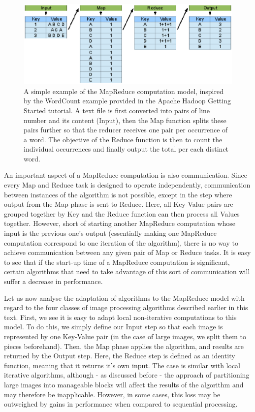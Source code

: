 \documentclass [12pt,a4paper]{report}
\begin{document}
\begin{figure}[h]
\begin{center}
\includegraphics[scale=0.5]{mapreduce.eps} %
\caption[A simple example of the MapReduce computation model]{A simple example of the MapReduce computation model, inspired by the WordCount example provided in the Apache Hadoop Getting Started tutorial. A text file is first converted into pairs of line number and its content (Input), then the Map function splits these pairs further so that the reducer receives one pair per occurrence of a word. The objective of the Reduce function is then to count the individual occurrences and finally output the total per each distinct word.}
\label{fig_mapreduce}
\end{center}
\end{figure}

An important aspect of a MapReduce computation is also communication. Since every Map and Reduce task is designed to operate independently, communication between instances of the algorithm is not possible, except in the step where output from the Map phase is sent to Reduce. Here, all Key-Value pairs are grouped together by Key and the Reduce function can then process all Values together. However, short of starting another MapReduce computation whose input is the previous one's output (essentially making one MapReduce computation correspond to one iteration of the algorithm), there is no way to achieve communication between any given pair of Map or Reduce tasks. It is easy to see that if the start-up time of a MapReduce computation is significant, certain algorithms that need to take advantage of this sort of communication will suffer a decrease in performance.

Let us now analyse the adaptation of algorithms to the MapReduce model with regard to the four classes of image processing algorithms described earlier in this text. First, we see it is easy to adapt local non-iterative computations to this model. To do this, we simply define our Input step so that each image is represented by one Key-Value pair (in the case of large images, we split them to pieces beforehand). Then, the Map phase applies the algorithm, and results are returned by the Output step. Here, the Reduce step is defined as an identity function, meaning that it returns it's own input. The case is similar with local iterative algorithms, although - as discussed before - the approach of partitioning large images into manageable blocks will affect the results of the algorithm and may therefore be inapplicable. However, in some cases, this loss may be outweighed by gains in performance when compared to sequential processing.
\end{document}
